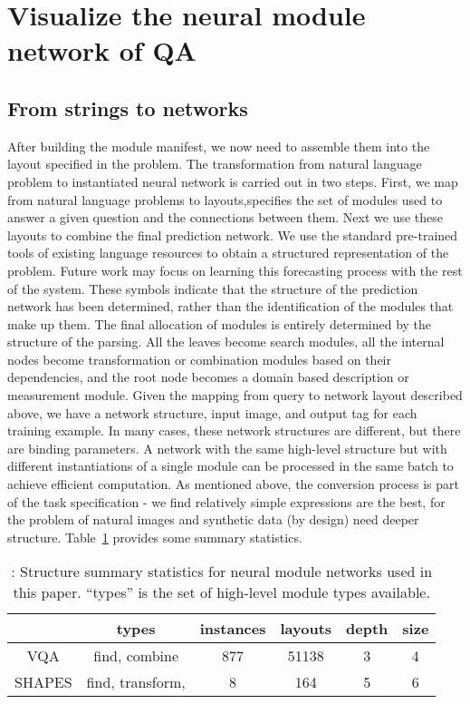 \documentclass[a4paper,18pt]{article}
\begin{document}
\section{Visualize the neural module network of QA}
\subsection{From strings to networks}
After building the module manifest, we now need to assemble them into the layout specified in the problem. The transformation from natural language problem to instantiated neural network is carried out in two steps. First, we map from natural language problems to layouts,specifies the set of modules used to answer a given question and the connections between them. Next we use these layouts to combine the final prediction network. We use the standard pre-trained tools of existing language resources to obtain a structured representation of the problem. Future work may focus on learning this forecasting process with the rest of the system. These symbols indicate that the structure of the prediction network has been determined, rather than the identification of the modules that make up them. The final allocation of modules is entirely determined by the structure of the parsing. All the leaves become search modules, all the internal nodes become transformation or combination modules based on their dependencies, and the root node becomes a domain based description or measurement module. Given the mapping from query to network layout described above, we have a network structure, input image, and output tag for each training example. In many cases, these network structures are different, but there are binding parameters. A network with the same high-level structure but with different instantiations of a single module can be processed in the same batch to achieve efficient computation. As mentioned above, the conversion process is part of the task specification - we find relatively simple expressions are the best, for the problem of natural images and synthetic data (by design) need deeper structure. Table~\ref{table1} provides some summary statistics.
\begin{table}[h]%
	\centering 
	\caption{: Structure summary statistics for neural module networks used in this paper. “types” is the set of high-level module types available.
	}\label{table1}
	\begin{tabular}{c|c|c|c|c|c}
		\hline
		& types &  instances&  layouts &depth& size\\
		\hline
		VQA & find, combine & 877 &51138 &3&4 \\
	
		SHAPES &  find, transform, & 8  &  164 &5&6\\
		\hline
	\end{tabular}
\end{table}
\end{document}
